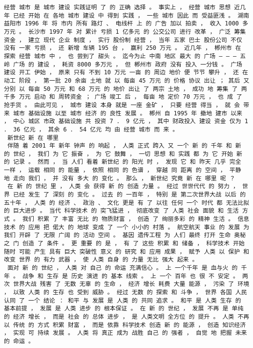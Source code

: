 \documentclass{article}
\begin{document}
\begin{Verbatim}[commandchars=\\\{\}]
 经营 城市 是 城市 建设 实践证明 了 的 正确 选择 。 事实上 ， 经营 城市 思想 近几年 已经 开始 在 各地 城市 建设 中 得到 实践 ， 一些 城市 因此 而 受益匪浅 。 湖南 益阳市 1996 年 将 市内 所有 路灯 、 电线杆 上 的 广告 加以 拍卖 ， 收入 1000 多万元 。 长沙市 1997 年 对 累计 亏损 1 亿多元 的 公交公司 进行 改革 ， 广泛 筹集资金 ， 建立 现代 企业 制度 ， 实行 股份制 经营 ， 当年 五家 巴士 股份公司 不仅 没有 一家 亏损 ， 还 新增 车辆 195 台 ， 赢利 250 万元 。 近几年 ， 郴州市 在 探索 经营 城市 中 ， 也 尝到了 甜头 。 迄今为止 中南 地区 最大 的 广场 — — — 五岭 广场 的 建设 ， 耗资 8000 多万元 ， 但 郴州市 政府 没有 投入 一分钱 。 广场 建设 开工 伊始 ， 原来 只有 不到 10 万元 一亩 的 周边 地价 便 节节 攀升 ， 还 在 动工 阶段 ， 第一批 20 余亩 土地 就 以 每亩 45 万元 的 价格 协议 出让 ； 其后 又 分别 以 每亩 50 万元 和 68 万元 的 地价 出让 了 两宗 土地 ， 成功 地 筹集 了 两千多 万元 启动 和 周转资金 ； 广场 竣工 后 ， 每亩 地 定价 70 万元 ， 也 成 了 抢手货 。 由此可见 ， 城市 建设 本身 就是 一座 金矿 ， 只要 经营 得当 ， 就 会 带来 城市 基础设施 以至 城市 经济 的 良性 发展 。 郴州 自 1995 年 撤地 建市 以来 ， 中心 城区 市政 基础设施 共 投资 7 ． 9 亿元 ， 其中 财政投入 建设 资金 仅为 1 ． 36 亿元 ， 其余 6 ． 54 亿元 均 由 经营 城市 而 来 。 
 新世纪 新 在 哪里 
 伴随 着 2001 年 新年 钟声 的 响起 ， 人类 正式 跨入 又 一个 新 的 千年 和 新 的 世纪 ， 我们 为 它 振奋 ， 为 它 鼓舞 ， 一切 思想 和 实践 都 为 它 开始 新 的 记录 。 然而 ， 当 人们 看着 新世纪 的 阳光 时 ， 发现 它 和 昨天 几乎 完全 一样 ， 运载 相同 的 能量 ， 依照 相同 的 色谱 ， 穿越 同 距离 的 空间 ， 平静 地 走向 我们 ， 并 没有 多大 的 变化 。 那么 ， 新世纪 究竟 新 在 哪里 呢 ？ 
 在 新 的 世纪 里 ， 人类 会 获得 新 的 创造 力量 。 经过 世世代代 的 努力 ， 世界 已经 发生 了 深刻 的 变化 。 过去 的 一百年 ， 特别 是 第二次世界大战 以后 的 五十年 ， 人类 的 经济 、 政治 、 文化 更是 有 了 以往 任何 一个 时代 都 无法比拟 的 巨大进步 。 当代 科学技术 的 突飞猛进 ， 彻底改变 了 人类 社会 面貌 和 生活 方式 。 我们 积累 了 丰富 无比 的 物质财富 ， 创造 了 绚丽多彩 的 精神 生活 。 信息技术 的 应用 把 偌大 的 地球 变成 了 一个 小小的 村落 。 航空航天 事业 的 发展 为 我们 开辟 了 无限 广阔 的 活动 空间 。 基因 遗传工程 为 人们 最终 打开 生命 奥秘 之 门 创造 了 条件 。 更 重要 的 是 ， 有 了 这些 积累 和 储备 ， 科学技术 开始 随时 可能 产生 具有 巨大 突破性 意义 的 研究 和 应用 成果 ， 赋予 人类 以 保护 和 改变 世界 的 有力 武器 ， 使 人类 自身 的 力量 无比 强大 起来 。 
 面对 新 的 世纪 ， 人类 对 自己 的 命运 充满信心 。 上 一个千年 是 血与火 的 千年 。 战争 和 生存 是 历史 演进 的 基本 线索 。 上 一个 百年 也 很 不 安定 。 两次 世界大战 残害 了 无数 无辜 的 生命 ， 经济 增长 耗费 大量 能源 ， 污染 了 环境 ， 以致 人类 的 生存 也 受到 威胁 。 经过 无数 的 探索 和 斗争 ， 世界 各国 人民 认同 了 一个 结论 ： 和平 与 发展 是 人类 的 共同 追求 。 和平 是 人类 生存 的 基本前提 ， 发展 是 人类 进步 的 根本保证 。 在 新 的 世纪 ， 发展 不再 是 单纯 的 经济 增长 ， 而是 社会 的 总体 进步 ， 是 人类文明 全方位 的 提升 。 人类 不再 以 传统 的 方式 积累 财富 ， 而是 依靠 科学技术 创造 新 的 能源 ， 创造 知识经济 ， 实现 可 持续 发展 。 人类 将 真正 成为 战胜 自己 的 强者 ， 自觉 地 把握 未来 的 命运 。 

\end{Verbatim}
\end{document}
